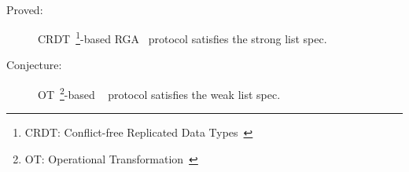 \begin{frame}{}

  \vspace{0.30cm}
  \begin{center}
     \\[6pt]
  \end{center}

  \pause
  \begin{description}
    \item[Proved:] CRDT~\footnote{CRDT: Conflict-free Replicated Data Types~\cite{Shapiro:SSS11}}-based RGA~\cite{Roh:JPDC11} protocol
      satisfies the strong list spec.
    \item[Conjecture:] OT~\footnote{OT: Operational Transformation~\cite{Ellis:SIGMOD89}}-based \textsl{}~\cite{Nichols:UIST95} protocol
      satisfies the weak list spec.
  \end{description}
\end{frame}
